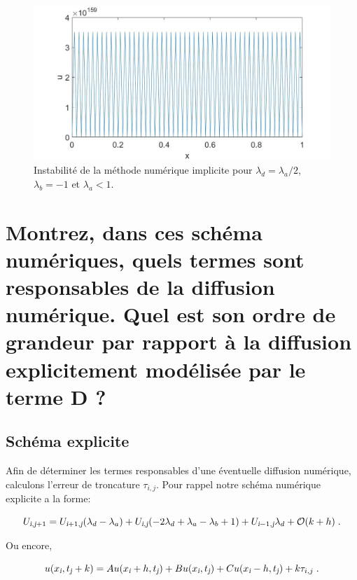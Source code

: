\documentclass[a4paper, 12pt]{report}
\begin{document}
\begin{figure}[H]
  \center
  \includegraphics[scale=0.4]{images/impl_instable_a1_b-1divk_D0dot005_h0dot01_k0dot00001.jpg}
  \caption{Instabilité de la méthode numérique implicite pour $\lambda_d = \lambda_a/2$, $\lambda_b = -1$ et $\lambda_a < 1$.}
  \label{eq:impl_instable}
\end{figure}


\section{Montrez, dans ces schéma numériques, quels termes sont responsables de la diffusion numérique. Quel est son ordre de grandeur par rapport à la diffusion explicitement modélisée par le terme D ?}

\subsection*{Schéma explicite}

Afin de déterminer les termes responsables d'une éventuelle diffusion
numérique, calculons l'erreur de troncature $\tau_{i,j}$. Pour rappel
notre schéma numérique explicite a la forme:

\begin{equation}
  U_{\textsl{i},\textsl{j}+1} = U_{\textsl{i}+1, \textsl{j}} (\lambda_d - \lambda_a) + U_{\textsl{i},\textsl{j}} (-2 \lambda_d + \lambda_a - \lambda_b +1) + U_{\textsl{i}-1,\textsl{j}} \lambda_d + \mathcal{O}(k+h) \;.
\end{equation}

Ou encore,

\begin{equation}
  u(x_{\textsl{i}},t_{\textsl{j}}+k) = A u(x_{\textsl{i}}+h, t_{\textsl{j}}) + B u(x_{\textsl{i}}, t_{\textsl{j}}) + C u(x_{\textsl{i}}-h, t_{\textsl{j}}) + k \tau_{i,j}\;.
\end{equation}
\end{document}
